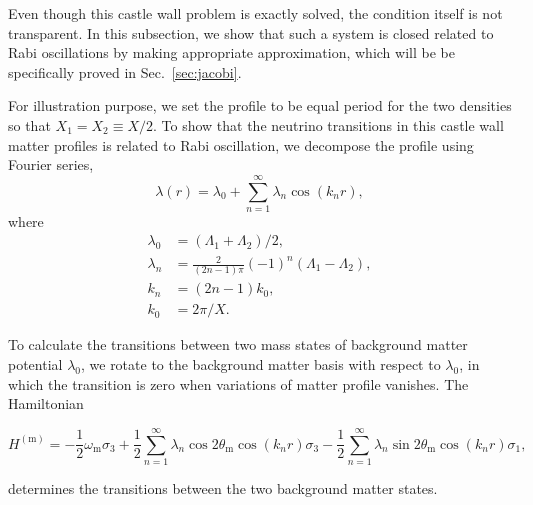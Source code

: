 \documentclass[%
reprint,
 amsmath,amssymb,
 aps,
]{revtex4-1}
\begin{document}
Even though this castle wall problem is exactly solved, the condition itself is not transparent. In this subsection, we show that such a system is closed related to Rabi oscillations by making appropriate approximation, which will be be specifically proved in Sec.~\ref{sec:jacobi}.

For illustration purpose, we set the profile to be equal period for the two densities so that $X_1=X_2\equiv X/2$. To show that the neutrino transitions in this castle wall matter profiles is related to Rabi oscillation, we decompose the profile using Fourier series,
\begin{equation}
\lambda(r) = \lambda_0 + \sum_{n=1}^{\infty} \lambda_n \cos\left( k_n  r \right),
\end{equation}
where 
\begin{align*}
\lambda_0 &= (\Lambda_1 + \Lambda_2)/2, \\
\lambda_n & = \frac{2}{(2n-1)\pi}  (-1)^n  \left( \Lambda_1 -  \Lambda_2 \right),\\
k_n &= (2n-1)k_0, \\
k_0 &= 2\pi/X.
\end{align*}

To calculate the transitions between two mass states of background matter potential $\lambda_0$, we rotate to the background matter basis with respect to $\lambda_0$, in which the transition is zero when variations of matter profile vanishes. The Hamiltonian
\begin{widetext}
\begin{equation}
H^{(\mathrm m)} = - \frac{1}{2}\omega_{\mathrm m} \sigma_3  + \frac{1}{2} \sum_{n=1}^{\infty} \lambda_n \cos 2\theta_{\mathrm m} \cos\left( k_n  r \right)  \sigma_3 - \frac{1}{2} \sum_{n=1}^{\infty} \lambda_n \sin 2\theta_{\mathrm m}  \cos\left( k_n r \right) \sigma_1,
\label{castle-wall-decomposed-hamiltonian}
\end{equation}
\end{widetext}
determines the transitions between the two background matter states.
\end{document}
